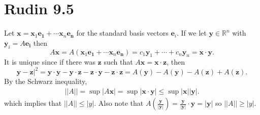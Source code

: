 \documentclass{article}
\begin{document}
\section*{Rudin 9.5}
Let $\bm{x} = \bm{x}_1\bm{e_1} + \cdots \bm{x}_n\bm{e_n}$ 
for the standard basis vectors $\bm{e}_i$.
If we let $\bm{y} \in \mathbb{R}^n$ with $\bm{y}_i = A\bm{e_i}$ then
\[
  A\bm{x} = A(\bm{x}_1\bm{e_1} + \cdots \bm{x}_n\bm{e_n}) =
   c_1\bm{y}_1 + \cdots + c_n\bm{y}_n =
   \bm{x} \cdot \bm{y}.
\]
It is unique since if there was $\bm{z}$ such that $A\bm{x} = \bm{x} \cdot \bm{z}$,
then 
\[
  \bm{y} - \bm{z}|^2 = 
  \bm{y}\cdot \bm{y} - \bm{y}\cdot \bm{z} - \bm{z}\cdot \bm{y} - \bm{z}\cdot \bm{z} =
  A(\bm{y}) - A(\bm{y}) - A(\bm{z}) + A(\bm{z}).
\]
By the Schwarz inequality,
\begin{align*}
  ||A|| = \sup |A \bm{x}|
        = \sup |\bm{x} \cdot \bm{y}|
        \leq \sup |\bm{x}||\bm{y}|.
\end{align*}
which implies that $||A|| \leq |y|$.
Also note that $A\left(\frac{\bm{y}}{|\bm{y}|}\right) = \frac{\bm{y}}{|\bm{y}|}\cdot \bm{y} = |\bm{y}|$
so  $||A|| \geq |y|$.
\end{document}
